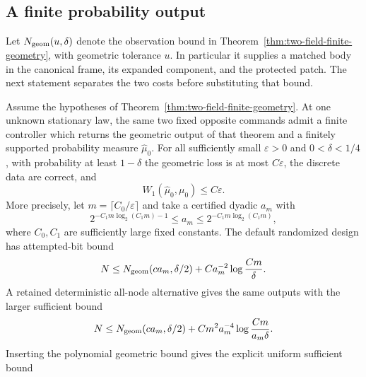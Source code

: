 \subsection{A finite probability output}
Let $N_{\rm geom}(u,\delta)$ denote the observation bound in
Theorem~\ref{thm:two-field-finite-geometry}, with geometric tolerance
$u$.  In particular it supplies a matched body in the canonical
frame, its expanded component, and the protected patch.  The next
statement separates the two costs before substituting that bound.

\begin{theorem}
\label{thm:two-field-finite-law}
Assume the hypotheses of Theorem~\ref{thm:two-field-finite-geometry}.
At one unknown stationary law, the same two fixed opposite commands
admit a finite controller which returns the geometric output of that
theorem and a finitely supported probability measure $\widehat\mu_0$.
For all sufficiently small $\varepsilon>0$ and $0<\delta<1/4$,
with probability at least $1-\delta$ the geometric loss is at most
$C\varepsilon$, the discrete data are correct, and
\begin{equation}\label{eq:two-field-finite-wasserstein}
                         W_1(\widehat\mu_0,\mu_0)
                                      \le C\varepsilon.
\end{equation}
More precisely, let $m=\lceil C_0/\varepsilon\rceil$ and take a
certified dyadic $a_m$ with
\begin{equation}\label{eq:two-field-moment-tolerance}
 2^{-C_1m\log_2(C_1m)-1}
       \le a_m\le 2^{-C_1m\log_2(C_1m)},
\end{equation}
where $C_0,C_1$ are sufficiently large fixed constants. The default
randomized design has attempted-bit bound
\begin{equation}\label{eq:two-field-joint-default-cost}
 N\le N_{\rm geom}(c a_m,\delta/2)
                         +Ca_m^{-2}\log\frac{Cm}{\delta}.
\end{equation}
A retained deterministic all-node alternative gives the same outputs
with the larger sufficient bound
\begin{equation}\label{eq:two-field-joint-decomposed-cost}
 N\le N_{\rm geom}(c a_m,\delta/2)
       +Cm^2a_m^{-4}\log\frac{Cm}{a_m\delta}.
\end{equation}
Inserting the polynomial geometric bound gives the explicit uniform
sufficient bound
\begin{equation}\label{eq:two-field-joint-exponential-cost}

\end{equation}
\end{theorem}
